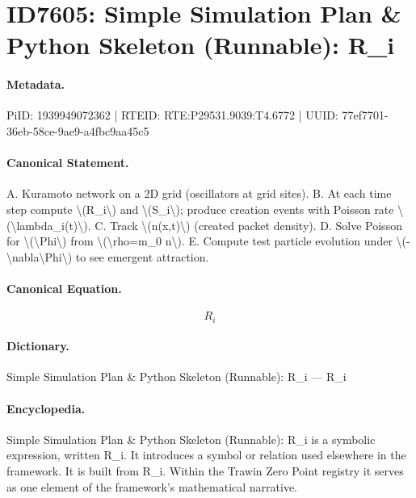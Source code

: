 \section*{ID7605: Simple Simulation Plan \& Python Skeleton (Runnable): R\_i}
\paragraph{Metadata.}
PiID: 1939949072362 | RTEID: RTE:P29531.9039:T4.6772 | UUID: 77ef7701-36eb-58ce-9ae9-a4fbc9aa45c5

\paragraph{Canonical Statement.}
A. Kuramoto network on a 2D grid (oscillators at grid sites). B. At each time step compute \textbackslash{}(R\_i\textbackslash{}) and \textbackslash{}(S\_i\textbackslash{}); produce creation events with Poisson rate \textbackslash{}(\textbackslash{}lambda\_i(t)\textbackslash{}). C. Track \textbackslash{}(n(x,t)\textbackslash{}) (created packet density). D. Solve Poisson for \textbackslash{}(\textbackslash{}Phi\textbackslash{}) from \textbackslash{}(\textbackslash{}rho=m\_0 n\textbackslash{}). E. Compute test particle evolution under \textbackslash{}(-\textbackslash{}nabla\textbackslash{}Phi\textbackslash{}) to see emergent attraction.

\paragraph{Canonical Equation.}
\[
R_i
\]

\paragraph{Dictionary.}
Simple Simulation Plan \& Python Skeleton (Runnable): R\_i — R\_i

\paragraph{Encyclopedia.}
Simple Simulation Plan \& Python Skeleton (Runnable): R\_i is a symbolic expression, written R\_i. It introduces a symbol or relation used elsewhere in the framework. It is built from R\_i. Within the Trawin Zero Point registry it serves as one element of the framework's mathematical narrative.
